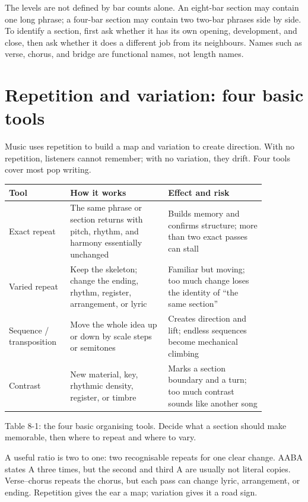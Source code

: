 The levels are not defined by bar counts alone. An eight-bar section may contain one long phrase; a four-bar section may contain two two-bar phrases side by side. To identify a section, first ask whether it has its own opening, development, and close, then ask whether it does a different job from its neighbours. Names such as verse, chorus, and bridge are functional names, not length names.

\section{Repetition and variation: four basic tools}

Music uses repetition to build a map and variation to create direction. With no repetition, listeners cannot remember; with no variation, they drift. Four tools cover most pop writing.

\begin{center}
\small
\begin{tabular}{p{0.18\linewidth}p{0.34\linewidth}p{0.34\linewidth}}
\toprule
Tool & How it works & Effect and risk \\
\midrule
Exact repeat & The same phrase or section returns with pitch, rhythm, and harmony essentially unchanged & Builds memory and confirms structure; more than two exact passes can stall \\
Varied repeat & Keep the skeleton; change the ending, rhythm, register, arrangement, or lyric & Familiar but moving; too much change loses the identity of ``the same section'' \\
Sequence / transposition & Move the whole idea up or down by scale steps or semitones & Creates direction and lift; endless sequences become mechanical climbing \\
Contrast & New material, key, rhythmic density, register, or timbre & Marks a section boundary and a turn; too much contrast sounds like another song \\
\bottomrule
\end{tabular}

Table 8-1: the four basic organising tools. Decide what a section should make memorable, then where to repeat and where to vary.
\end{center}

A useful ratio is two to one: two recognisable repeats for one clear change. AABA states A three times, but the second and third A are usually not literal copies. Verse--chorus repeats the chorus, but each pass can change lyric, arrangement, or ending. Repetition gives the ear a map; variation gives it a road sign.

